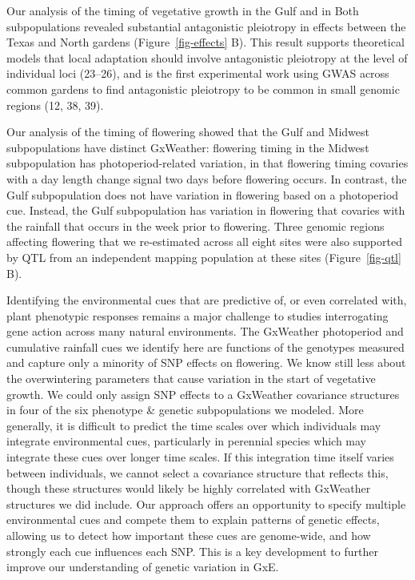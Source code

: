 \documentclass[
  9pt,
  twocolumn,
  twoside]{pnas-new}
\begin{document}
Our analysis of the timing of vegetative growth in the Gulf and in Both
subpopulations revealed substantial antagonistic pleiotropy in effects
between the Texas and North gardens (Figure~\ref{fig-effects} B). This
result supports theoretical models that local adaptation should involve
antagonistic pleiotropy at the level of individual loci (23--26), and is
the first experimental work using GWAS across common gardens to find
antagonistic pleiotropy to be common in small genomic regions (12, 38,
39).

Our analysis of the timing of flowering showed that the Gulf and Midwest
subpopulations have distinct GxWeather: flowering timing in the Midwest
subpopulation has photoperiod-related variation, in that flowering
timing covaries with a day length change signal two days before
flowering occurs. In contrast, the Gulf subpopulation does not have
variation in flowering based on a photoperiod cue. Instead, the Gulf
subpopulation has variation in flowering that covaries with the rainfall
that occurs in the week prior to flowering. Three genomic regions
affecting flowering that we re-estimated across all eight sites were
also supported by QTL from an independent mapping population at these
sites (Figure~\ref{fig-qtl} B).

Identifying the environmental cues that are predictive of, or even
correlated with, plant phenotypic responses remains a major challenge to
studies interrogating gene action across many natural environments. The
GxWeather photoperiod and cumulative rainfall cues we identify here are
functions of the genotypes measured and capture only a minority of SNP
effects on flowering. We know still less about the overwintering
parameters that cause variation in the start of vegetative growth. We
could only assign SNP effects to a GxWeather covariance structures in
four of the six phenotype \& genetic subpopulations we modeled. More
generally, it is difficult to predict the time scales over which
individuals may integrate environmental cues, particularly in perennial
species which may integrate these cues over longer time scales. If this
integration time itself varies between individuals, we cannot select a
covariance structure that reflects this, though these structures would
likely be highly correlated with GxWeather structures we did include.
Our approach offers an opportunity to specify multiple environmental
cues and compete them to explain patterns of genetic effects, allowing
us to detect how important these cues are genome-wide, and how strongly
each cue influences each SNP. This is a key development to further
improve our understanding of genetic variation in GxE.
\end{document}
